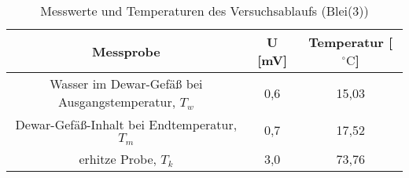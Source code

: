 \begin{table}[h]
	\begin{center}
		\begin{tabular}{ccc}
			Messprobe & U [mV] & Temperatur [$^{\circ}\mathrm{C}$]\\ \hline
			Wasser im Dewar-Gefäß bei Ausgangstemperatur, $T_w$&0,6&15,03\\
			Dewar-Gefäß-Inhalt bei Endtemperatur, $T_m$&0,7&17,52\\
			erhitze Probe, $T_k$&3,0&73,76
		\end{tabular}
		\caption{Messwerte und Temperaturen des Versuchsablaufs (Blei(3))}
		\label{tabblei3}
	\end{center}
\end{table}